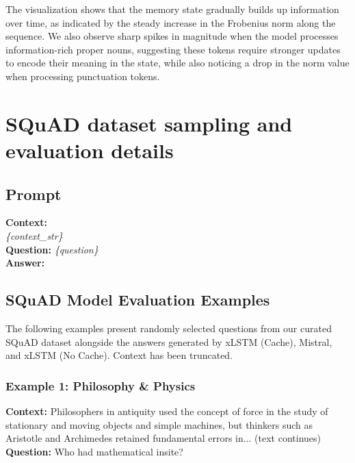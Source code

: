 \noindent The visualization shows that the memory state gradually builds up information over time, as indicated by the 
steady increase in the Frobenius norm along the sequence. We also observe sharp spikes in magnitude when the 
model processes information-rich proper nouns, suggesting these tokens require stronger updates to encode 
their meaning in the state, while also noticing a drop in the norm value when processing punctuation tokens. 

\section{SQuAD dataset sampling and evaluation details}
\label{app-sec:squad-details}
\subsection{Prompt}
\begin{tcolorbox}[
    colback=gray!5!white,
    colframe=blue!70!black,
    title=\textbf{SQuAD Evaluation Prompt Template},
    fonttitle=\sffamily\bfseries,
    boxrule=1mm,
    arc=3mm
]
\noindent\textbf{Context:}\\[1em]
\textit{\{context\_str\}}\\[1em]
\textbf{Question:} \textit{\{question\}}\\
\textbf{Answer:} 
\end{tcolorbox}

\subsection{SQuAD Model Evaluation Examples}
\label{app:squad-examples}


The following examples present randomly selected questions from our curated SQuAD dataset alongside the answers generated by xLSTM (Cache), Mistral, and xLSTM (No Cache). Context has been truncated. 

\subsubsection{Example 1: Philosophy \& Physics}

\begin{tcolorbox}[colback=blue!5!white, colframe=blue!75!black, title=Prompt]
\textbf{Context:} Philosophers in antiquity used the concept of force in the study of stationary and moving objects and simple machines, 
but thinkers such as Aristotle and Archimedes retained fundamental errors in... (text continues)\\
\textbf{Question:} Who had mathematical insite?
\end{tcolorbox}

